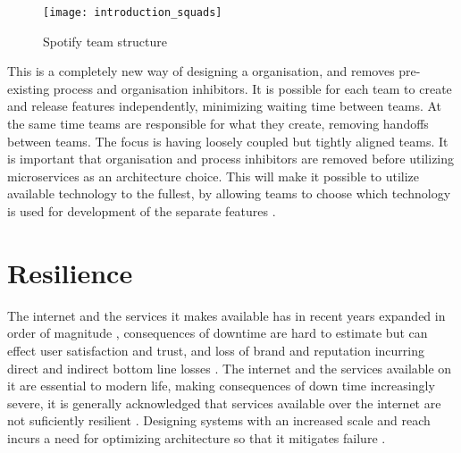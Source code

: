 \begin{figure}[!htb]
  \begin{center} 
	  \texttt{[image: introduction\_squads]}  
  \end{center}
  \caption{Spotify team structure}
  \label{fig:introduction_squads}
\end{figure}

This is a completely new way of designing a organisation, and removes pre-existing process and organisation inhibitors. It is possible for each team to create and release features independently, minimizing waiting time between teams. At the same time teams are responsible for what they create, removing handoffs between teams. The focus is having loosely coupled but tightly aligned teams.
It is important that organisation and process inhibitors are removed before utilizing microservices as an architecture choice\cite{meshenberg2016microservices}. This will make it possible to utilize available technology to the fullest, by allowing teams to choose which technology is used for development of the separate features \cite{fowler2014polyglot}. 


\section{Resilience}
The internet and the services it makes available has in recent years expanded in order of magnitude \cite[p.~4]{nygard2007release}, consequences of downtime are hard to estimate but can effect user satisfaction and trust, and loss of brand and reputation incurring direct and indirect bottom line losses \cite[p.~26]{beyer2016siteReliabilityEngineering}. The internet and the services available on it are essential to modern life, making consequences of down time increasingly severe, it is generally acknowledged that services available over the internet are not suficiently resilient \cite{sterbenz2010resilience}. Designing systems with an increased scale and reach incurs a need for optimizing architecture so that it mitigates failure \cite[p.~4]{nygard2007release}.


